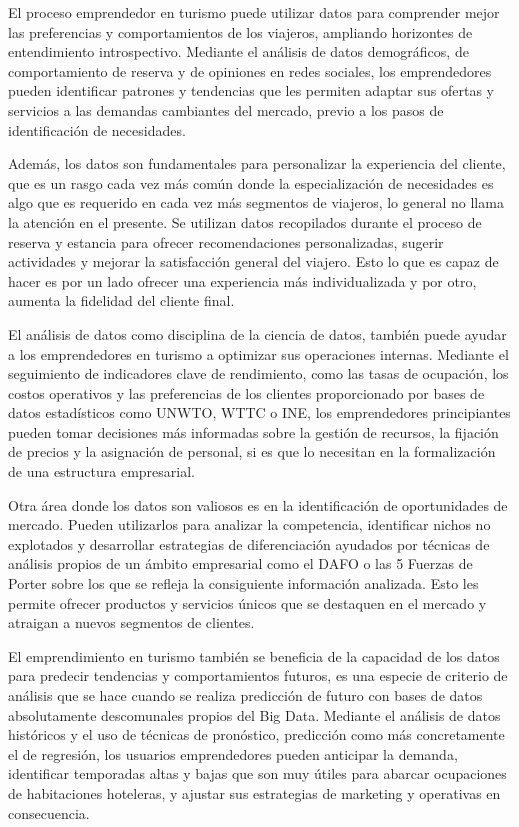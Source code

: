 \documentclass[
  letterpaper,
  DIV=11,
  numbers=noendperiod]{scrreprt}
\begin{document}
El proceso emprendedor en turismo puede utilizar datos para comprender
mejor las preferencias y comportamientos de los viajeros, ampliando
horizontes de entendimiento introspectivo. Mediante el análisis de datos
demográficos, de comportamiento de reserva y de opiniones en redes
sociales, los emprendedores pueden identificar patrones y tendencias que
les permiten adaptar sus ofertas y servicios a las demandas cambiantes
del mercado, previo a los pasos de identificación de necesidades.

Además, los datos son fundamentales para personalizar la experiencia del
cliente, que es un rasgo cada vez más común donde la especialización de
necesidades es algo que es requerido en cada vez más segmentos de
viajeros, lo general no llama la atención en el presente. Se utilizan
datos recopilados durante el proceso de reserva y estancia para ofrecer
recomendaciones personalizadas, sugerir actividades y mejorar la
satisfacción general del viajero. Esto lo que es capaz de hacer es por
un lado ofrecer una experiencia más individualizada y por otro, aumenta
la fidelidad del cliente final.

El análisis de datos como disciplina de la ciencia de datos, también
puede ayudar a los emprendedores en turismo a optimizar sus operaciones
internas. Mediante el seguimiento de indicadores clave de rendimiento,
como las tasas de ocupación, los costos operativos y las preferencias de
los clientes proporcionado por bases de datos estadísticos como UNWTO,
WTTC o INE, los emprendedores principiantes pueden tomar decisiones más
informadas sobre la gestión de recursos, la fijación de precios y la
asignación de personal, si es que lo necesitan en la formalización de
una estructura empresarial.

Otra área donde los datos son valiosos es en la identificación de
oportunidades de mercado. Pueden utilizarlos para analizar la
competencia, identificar nichos no explotados y desarrollar estrategias
de diferenciación ayudados por técnicas de análisis propios de un ámbito
empresarial como el DAFO o las 5 Fuerzas de Porter sobre los que se
refleja la consiguiente información analizada. Esto les permite ofrecer
productos y servicios únicos que se destaquen en el mercado y atraigan a
nuevos segmentos de clientes.

El emprendimiento en turismo también se beneficia de la capacidad de los
datos para predecir tendencias y comportamientos futuros, es una especie
de criterio de análisis que se hace cuando se realiza predicción de
futuro con bases de datos absolutamente descomunales propios del Big
Data. Mediante el análisis de datos históricos y el uso de técnicas de
pronóstico, predicción como más concretamente el de regresión, los
usuarios emprendedores pueden anticipar la demanda, identificar
temporadas altas y bajas que son muy útiles para abarcar ocupaciones de
habitaciones hoteleras, y ajustar sus estrategias de marketing y
operativas en consecuencia.
\end{document}
